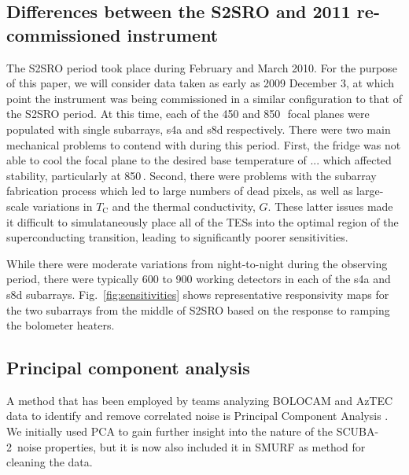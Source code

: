 \documentclass[useAMS,usenatbib,nofootinbib]{mn2e}
\newcommand{\scuba}{SCUBA-2}
\begin{document}
\subsection{Differences between the S2SRO and 2011 re-commissioned instrument}

The S2SRO period took place during February and March 2010. For the
purpose of this paper, we will consider data taken as early as 2009
December 3, at which point the instrument was being commissioned in a
similar configuration to that of the S2SRO period. At this time, each
of the 450 and 850\,\micron\ focal planes were populated with single
subarrays, s4a and s8d respectively. There were two main mechanical
problems to contend with during this period. First, the fridge was not
able to cool the focal plane to the desired base temperature of
... which affected stability, particularly at 850\,\micron. Second,
there were problems with the subarray fabrication process which led to
large numbers of dead pixels, as well as large-scale variations in
$T_\mathrm{C}$ and the thermal conductivity, $G$. These latter issues
made it difficult to simulataneously place all of the TESs into the
optimal region of the superconducting transition, leading to
significantly poorer sensitivities.

While there were moderate variations from night-to-night during the
observing period, there were typically 600 to 900 working detectors in
each of the s4a and s8d subarrays. Fig.~\ref{fig:sensitivities} shows
representative responsivity maps for the two subarrays from the middle
of S2SRO based on the response to ramping the bolometer heaters.

\subsection{Principal component analysis}
\label{sec:pca}

A method that has been employed by teams analyzing BOLOCAM and AzTEC
data to identify and remove correlated noise is Principal Component
Analysis \citep[PCA,][]{laurent2005,scott2008}. We initially used PCA
to gain further insight into the nature of the \scuba\ noise
properties, but it is now also included it in SMURF as method for
cleaning the data.
\end{document}
